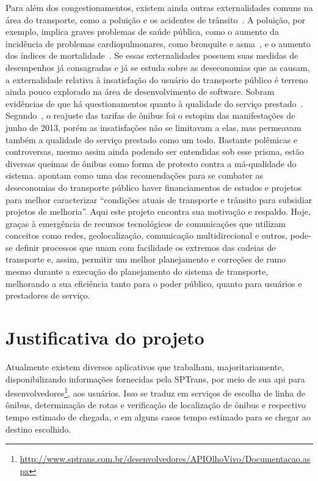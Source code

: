 Para além dos congestionamentos, existem ainda outras externalidades comuns na área do transporte, como a poluição e os acidentes de trânsito~\cite{vasconcellos1998}. A poluição, por exemplo, implica graves problemas de saúde pública, como o aumento da incidência de problemas cardiopulmonares, como bronquite e asma~\cite{kunzli2000}, e o aumento dos índices de mortalidade~\cite{finkelstein2004}.
Se essas externalidades possuem suas medidas de desempenhos já consagradas e já se estuda sobre as deseconomias que as causam, a externalidade relativa à insatisfação do usuário do transporte público é terreno ainda pouco explorado na área de desenvolvimento de software.
Sobram evidências de que há questionamentos quanto à qualidade do serviço prestado~\cite{UrbanaPE2010,Rodrigues,Rodrigues2006,Cellos2012}. Segundo~, o reajuste das tarifas de ônibus foi o estopim das manifestações de junho de 2013, porém as insatisfações não se limitavam a elas, mas permeavam também a qualidade do serviço prestado como um todo. Bastante polêmicas e controversas, mesmo assim ainda podendo ser entendidas sob esse prisma, estão diversas queimas de ônibus como forma de protesto contra a má-qualidade do sistema.  apontam como uma das recomendações para se combater as deseconomias do transporte público haver financiamentos de estudos e projetos para melhor caracterizar ``condições atuais de transporte e trânsito para subsidiar projetos de melhoria''.
Aqui este projeto encontra sua motivação e respaldo. Hoje, graças à emergência de recursos tecnológicos de comunicações que utilizam conceitos como redes, geolocalização, comunicação multidirecional e outros, pode-se definir processos que unam com facilidade os extremos das cadeias de transporte e, assim, permitir um melhor planejamento e correções de rumo mesmo durante a execução do planejamento do sistema de transporte, melhorando a sua eficiência tanto para o poder público, quanto para usuários e prestadores de serviço.

\section{Justificativa do projeto}\label{sec:justificativa}
Atualmente existem diversos aplicativos que trabalham, majoritariamente, disponibilizando informações fornecidas pela SPTrans, por meio de sua \gls{api} para desenvolvedores\footnote{\url{http://www.sptrans.com.br/desenvolvedores/APIOlhoVivo/Documentacao.aspx}}, aos usuários. 
Isso se traduz em serviços de escolha de linha de ônibus, determinação de rotas e verificação de localização de ônibus e respectivo tempo estimado de chegada, e em alguns casos tempo estimado para se chegar ao destino escolhido.

